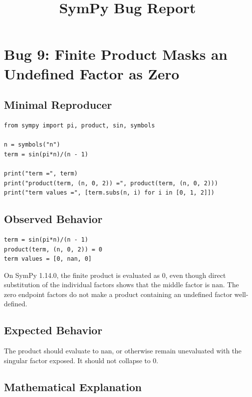 \documentclass[11pt]{article}
\title{SymPy Bug Report}
\author{}
\date{}
\begin{document}
\maketitle

\section{Bug 9: Finite Product Masks an Undefined Factor as Zero}

\subsection{Minimal Reproducer}

\medskip

\begin{lstlisting}[style=bugpython]
from sympy import pi, product, sin, symbols

n = symbols("n")
term = sin(pi*n)/(n - 1)

print("term =", term)
print("product(term, (n, 0, 2)) =", product(term, (n, 0, 2)))
print("term values =", [term.subs(n, i) for i in [0, 1, 2]])
\end{lstlisting}

\subsection{Observed Behavior}

\medskip

\begin{lstlisting}[style=bugpython]
term = sin(pi*n)/(n - 1)
product(term, (n, 0, 2)) = 0
term values = [0, nan, 0]
\end{lstlisting}

On SymPy 1.14.0, the finite product is evaluated as \(0\), even though direct
substitution of the individual factors shows that the middle factor is
\(\mathrm{nan}\). The zero endpoint factors do not make a product containing an
undefined factor well-defined.

\subsection{Expected Behavior}

The product should evaluate to \(\mathrm{nan}\), or otherwise remain unevaluated
with the singular factor exposed. It should not collapse to \(0\).

\subsection{Mathematical Explanation}
\end{document}
